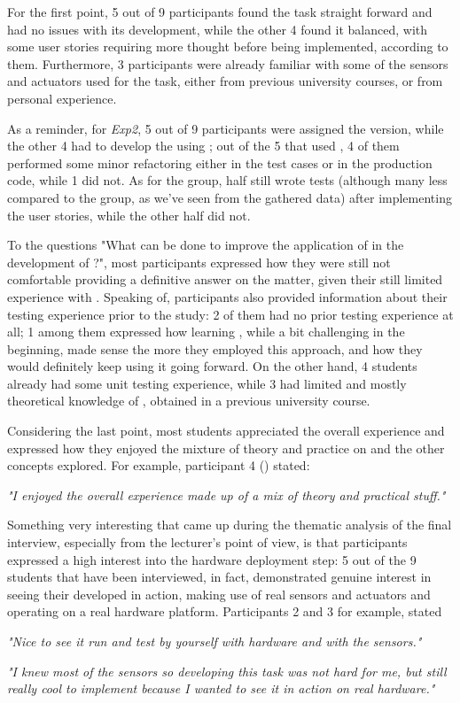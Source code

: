 For the first point, 5 out of 9 participants found the task straight forward and had no issues with its development, while the other 4 found it balanced, with some user stories requiring more thought before being implemented, according to them. Furthermore, 3 participants were already familiar with some of the sensors and actuators used for the task, either from previous university courses, or from personal experience.

As a reminder, for \textit{Exp2}, 5 out of 9 participants were assigned the \tdd version, while the other 4 had to develop the \es using \notdd; out of the 5 that used \tdd, 4 of them performed some minor refactoring either in the test cases or in the production code, while 1 did not.
As for the \notdd group, half still wrote tests (although many less compared to the \tdd group, as we've seen from the gathered data) after implementing the user stories, while the other half did not.

To the questions "What can be done to improve the application of \tdd in the development of \ess?", most participants expressed how they were still not comfortable providing a definitive answer on the matter, given their still limited experience with \tdd.
Speaking of, participants also provided information about their testing experience prior to the study: 2 of them had no prior testing experience at all; 1 among them expressed how learning \tdd, while a bit challenging in the beginning, made sense the more they employed this approach, and how they would definitely keep using it going forward. On the other hand, 4 students already had some unit testing experience, while 3 had limited and mostly theoretical knowledge of \tdd, obtained in a previous university course.

Considering the last point, most students appreciated the overall experience and expressed how they enjoyed the mixture of theory and practice on \tdd and the other concepts explored. For example, participant 4 (\tdd) stated:
\begin{mdframed}
    \textit{"I enjoyed the overall experience made up of a mix of theory and practical stuff."}
\end{mdframed}

Something very interesting that came up during the thematic analysis of the final interview, especially from the lecturer's point of view, is that participants expressed a high interest into the hardware deployment step: 5 out of the 9 students that have been interviewed, in fact, demonstrated genuine interest in seeing their developed \es in action, making use of real sensors and actuators and operating on a real hardware platform. 
Participants 2 and 3 for example, stated
\begin{mdframed}
    \textit{"Nice to see it run and test by yourself with hardware and with the sensors."}
\end{mdframed}
\begin{mdframed}
    \textit{"I knew most of the sensors so developing this task was not hard for me, but still really cool to implement because I wanted to see it in action on real hardware."}
\end{mdframed}


